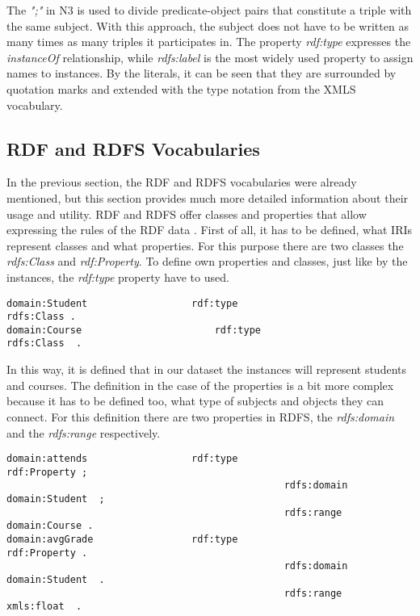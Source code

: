 The \textit{";"} in N3 is used to divide predicate-object pairs that constitute a triple with the same subject. With this approach, the subject does not have to be written as many times as many triples it participates in. The property \textit{rdf:type} expresses the \textit{instanceOf} relationship, while \textit{rdfs:label} is the most widely used property to assign names to instances. By the literals, it can be seen that they are surrounded by quotation marks and extended with the type notation from the XMLS vocabulary.

\subsection{RDF and RDFS Vocabularies}

In the previous section, the RDF and RDFS vocabularies were already mentioned, but this section provides much more detailed information about their usage and utility. RDF and RDFS offer classes and properties that allow expressing the rules of the RDF data \cite{Brickley:04:RVD}. First of all, it has to be defined, what IRIs represent classes and what properties. For this purpose there are two classes the \textit{rdfs:Class} and \textit{rdf:Property}. To define own properties and classes, just like by the instances, the \textit{rdf:type} property have to used.

\newpage
\begin{lstlisting}[basicstyle=\footnotesize, captionpos=b, caption=Class definition, label=lst:sparql, belowskip=1em, aboveskip=4em,
frame=single]
domain:Student					rdf:type						rdfs:Class .
domain:Course						rdf:type						rdfs:Class	.
\end{lstlisting}


In this way, it is defined that in our dataset the instances will represent students and courses. The definition in the case of the properties is a bit more complex because it has to be defined too, what type of subjects and objects they can connect. For this definition there are two properties in RDFS, the \textit{rdfs:domain} and the \textit{rdfs:range} respectively.


\begin{lstlisting}[basicstyle=\footnotesize, captionpos=b, caption=Property definition I., label=lst:sparql,  belowskip=1em, aboveskip=2em,
frame=single]
domain:attends					rdf:type						rdf:Property ;
												rdfs:domain					domain:Student	;
												rdfs:range					domain:Course .
domain:avgGrade					rdf:type						rdf:Property .
												rdfs:domain					domain:Student	.
												rdfs:range					xmls:float	.
\end{lstlisting}

